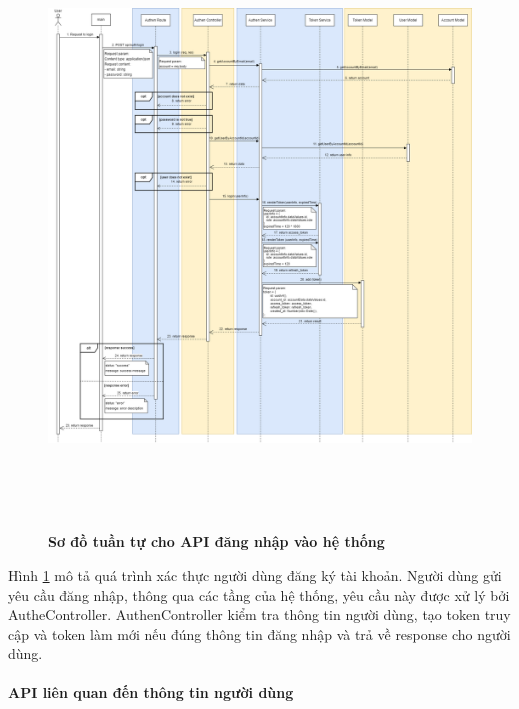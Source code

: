 \begin{figure}[H]
  \centering
  \includegraphics[width=16cm,height=16cm]{Images/sequence_api/login.png}
  \caption[Sơ đồ tuần tự cho API đăng nhập vào hệ thống]{\bfseries \fontsize{12pt}{0pt}
  \selectfont Sơ đồ tuần tự cho API đăng nhập vào hệ thống }
  \label{register} %
\end{figure}
Hình \ref{register}  mô tả quá trình xác thực người dùng đăng ký tài khoản. Người dùng gửi yêu cầu đăng nhập, thông qua các tầng của hệ thống, yêu cầu này được xử lý bởi AutheController. AuthenController kiểm tra thông tin người dùng, tạo token truy cập và token làm mới 
nếu đúng thông tin đăng nhập và trả về response cho người dùng.





\paragraph{API liên quan đến thông tin người dùng}
\mbox{}

